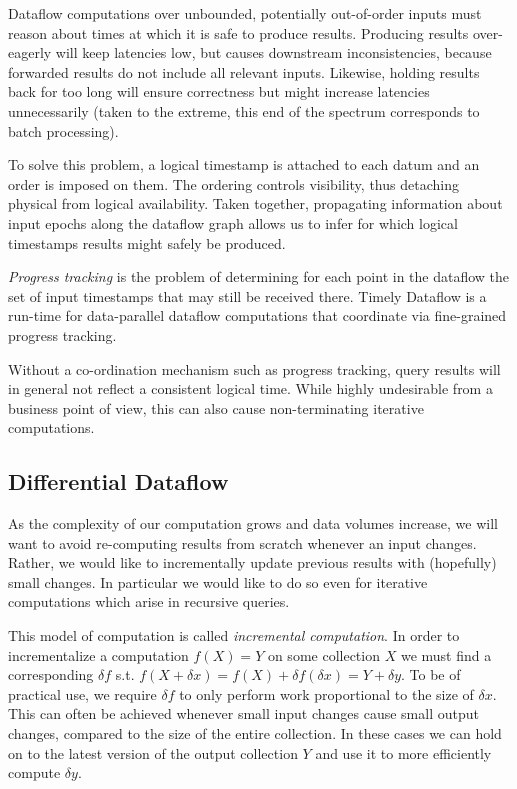 \documentclass[../index.tex]{subfiles}
\begin{document}
Dataflow computations over unbounded, potentially out-of-order inputs
must reason about times at which it is safe to produce
results. Producing results over-eagerly will keep latencies low, but
causes downstream inconsistencies, because forwarded results do not
include all relevant inputs. Likewise, holding results back for too
long will ensure correctness but might increase latencies
unnecessarily (taken to the extreme, this end of the spectrum
corresponds to batch processing).

To solve this problem, a logical timestamp is attached to each datum
and an order is imposed on them. The ordering controls visibility,
thus detaching physical from logical availability. Taken together,
propagating information about input epochs along the dataflow graph
allows us to infer for which logical timestamps results might safely
be produced.

\emph{Progress tracking} is the problem of determining for each point
in the dataflow the set of input timestamps that may still be received
there. Timely Dataflow is a run-time for data-parallel dataflow
computations that coordinate via fine-grained progress tracking.

Without a co-ordination mechanism such as progress tracking, query
results will in general not reflect a consistent logical time. While
highly undesirable from a business point of view, this can also cause
non-terminating iterative computations.

\subsection{Differential Dataflow} \label{background-differential}

As the complexity of our computation grows and data volumes increase,
we will want to avoid re-computing results from scratch whenever an
input changes. Rather, we would like to incrementally update previous
results with (hopefully) small changes. In particular we would like to
do so even for iterative computations which arise in recursive
queries.

This model of computation is called \emph{incremental computation}. In
order to incrementalize a computation $f(X) = Y$ on some collection
$X$ we must find a corresponding $\delta{f}$ s.t. $f(X + \delta{x}) =
f(X) + \delta{f}(\delta{x}) = Y + \delta{y}$. To be of practical use,
we require $\delta{f}$ to only perform work proportional to the size
of $\delta{x}$. This can often be achieved whenever small input
changes cause small output changes, compared to the size of the entire
collection. In these cases we can hold on to the latest version of the
output collection $Y$ and use it to more efficiently compute
$\delta{y}$.
\end{document}
